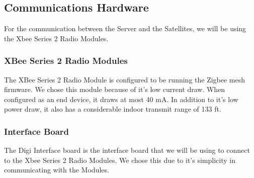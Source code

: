 
\subsection{Communications Hardware}

For the communication between the Server and the Satellites,
we will be using the Xbee Series 2 Radio Modules.

\subsubsection{XBee Series 2 Radio Modules}

The XBee Series 2 Radio Module is configured to be running
the Zigbee mesh firmware. We chose this module because of it's
low current draw. When configured as an end device, it draws at
most 40 mA. In addition to it's low power draw, it also has a 
considerable indoor transmit range of 133 ft.

\subsubsection{Interface Board}

The Digi Interface board is the interface board that we will
be using to connect to the Xbee Series 2 Radio Modules. We 
chose this due to it's simplicity in communicating with the
Modules.

